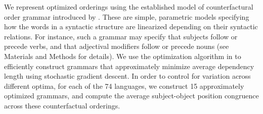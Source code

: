 \documentclass[9pt,twocolumn,twoside,lineno]{pnas-new}
\newcommand\mhahn[1]{{\color{red}(#1)}}
\begin{document}
We represent optimized orderings using the  established model of counterfactural order grammar introduced by \cite{gildea-optimizing-2007}.
These are simple, parametric models specifying how the words in a syntactic structure are linearized depending on their syntactic relations.
For instance, such a grammar may specify that subjects follow or precede verbs, and that adjectival modifiers follow or precede nouns (see Materials and Methods for details).
We use the optimization algorithm in \cite{hahn2020universals} to efficiently construct grammars that approximately minimize average dependency length using stochastic gradient descent.
%
In order to control for variation across different optima, for each of the 74 languages, we construct 15 approximately optimized grammars, and compute the average subject-object position congruence across these counterfactual orderings.




\end{document}
